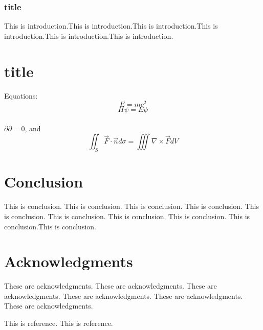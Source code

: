 \documentclass[hyperref]{ctexart}
\begin{document}
\begin{multicols}{2}
        \subsubsection{title}
        This is introduction.This is introduction.This is introduction.This is introduction.This is introduction.This is introduction.
        \section{title}
        \noindent Equations:
        \begin{equation}
            E=mc^2
        \end{equation}
        \begin{equation}
            H\psi=E\psi
        \end{equation}\\
        $\partial\partial=0$, and
        $$\iint_S \vec{F}\cdot \vec{n}d\sigma=\iiint \nabla\times\vec{F}dV$$
        \section{Conclusion}           
        This is conclusion. This is conclusion. This is conclusion. This is conclusion. This is conclusion. This is conclusion. This is conclusion. This is conclusion. This is conclusion.This is conclusion.
        \section*{Acknowledgments}
        These are acknowledgments. These are acknowledgments. These are acknowledgments. These are acknowledgments. These are acknowledgments. These are acknowledgments.
        \begin{thebibliography}{100}%
            This is reference.%
            This is reference.%
        \end{thebibliography}
    \end{multicols}
\end{document}

